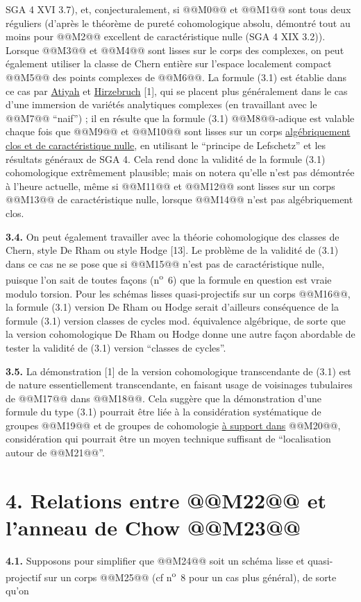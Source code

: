 
SGA 4 XVI 3.7), et,
conjecturalement, si @@M0@@ et @@M1@@ sont tous deux réguliers (d'après le théorème de pureté cohomologique absolu, démontré tout au moins pour @@M2@@ excellent de caractéristique nulle (SGA 4 XIX 3.2)). Lorsque @@M3@@ et @@M4@@ sont lisses sur le corps des complexes, on peut également utiliser la classe de Chern entière sur l'espace localement compact @@M5@@ des points complexes de @@M6@@. La formule (3.1) est établie dans ce cas par \uline{Atiyah} et \uline{Hirzebruch} [1], qui se placent plus généralement dans le cas d'une immersion de variétés analytiques complexes (en travaillant avec le @@M7@@ ``naif'') ; il en résulte que la formule (3.1) @@M8@@-adique est valable chaque fois que @@M9@@ et @@M10@@ sont lisses sur un corps \uline{algébriquement clos et de caractéristique nulle}, en utilisant le ``principe de Lefschetz'' et les résultats généraux de SGA 4. Cela rend donc la validité de la formule (3.1) cohomologique extrêmement plausible; mais on notera qu'elle n'est pas démontrée à l'heure actuelle, même si @@M11@@ et @@M12@@ sont lisses sur un corps @@M13@@ de caractéristique nulle, lorsque @@M14@@ n'est pas algébriquement clos.

\textbf{3.4.} On peut également travailler avec la théorie cohomologique des classes de Chern, style De Rham ou style Hodge [13]. Le problème de la validité de (3.1) dans ce cas ne se pose que si @@M15@@ n'est pas de caractéristique nulle, puisque l'on sait de toutes façons (n\textsuperscript{o}~6) que la formule en question est vraie modulo torsion. Pour les schémas lisses quasi-projectifs sur un corps @@M16@@, la formule (3.1) version De Rham ou Hodge serait d'ailleurs conséquence de la formule (3.1) version classes de cycles mod. équivalence algébrique, de sorte que la version cohomologique De Rham ou Hodge donne une autre façon abordable de tester la validité de (3.1) version ``classes de cycles''.

\textbf{3.5.} La démonstration [1] de la version cohomologique transcendante de (3.1) est de nature essentiellement transcendante, en faisant usage de voisinages tubulaires de @@M17@@ dans @@M18@@. Cela suggère que la démonstration d'une formule du type (3.1) pourrait être liée à la considération systématique de groupes @@M19@@ et de groupes de cohomologie \uline{à support dans} @@M20@@, considération qui pourrait être un moyen technique suffisant de ``localisation autour de @@M21@@''.

\section*{4. Relations entre @@M22@@ et l'anneau de Chow @@M23@@}

\textbf{4.1.} Supposons pour simplifier que @@M24@@ soit un schéma lisse et quasi-projectif sur un corps @@M25@@ (cf n\textsuperscript{o}~8 pour un cas plus général), de sorte qu'on
